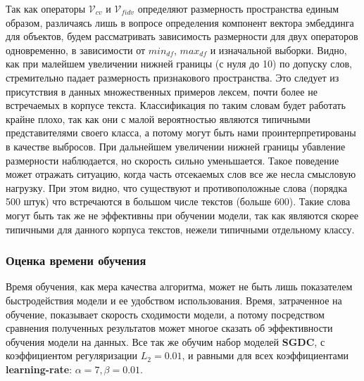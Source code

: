 \documentclass{article}
\begin{document}
            Так как операторы $\mathcal{V}_{cv}$ и $\mathcal{V}_{fidv}$ определяют размерность пространства единым образом, различаясь лишь в вопросе определения компонент вектора эмбеддинга для объектов, будем рассматривать зависимость размерности для двух операторов одновременно, в зависимости от ${min}_{df}$, ${max}_{df}$ и изначальной выборки. 
\clearpage
            Видно, как при малейшем увеличении нижней границы (с нуля до 10) по допуску слов, стремительно падает размерность признакового пространства. Это следует из присутствия в данных множественных примеров лексем, почти более не встречаемых в корпусе текста. Классификация по таким словам будет работать крайне плохо, так как они с малой вероятностью являются типичными представителями своего класса, а потому могут быть нами проинтерпретированы в качестве выбросов. При дальнейшем увеличении нижней границы убавление размерности наблюдается, но скорость сильно уменьшается. Такое поведение может отражать ситуацию, когда часть отсекаемых слов все же несла смысловую нагрузку. При этом видно, что существуют и противоположные слова (порядка 500 штук) что встречаются в большом числе текстов (больше 600). Такие слова могут быть так же не эффективны при обучении модели, так как являются скорее типичными для данного корпуса текстов, нежели типичными отдельному классу. 

        \subsubsection{Оценка времени обучения}

            Время обучения, как мера качества алгоритма, может не быть лишь показателем быстродействия модели и ее удобством использования. Время, затраченное на обучение, показывает скорость сходимости модели, а потому посредством сравнения полученных результатов может многое сказать об эффективности обучения модели на данных. Все так же обучим набор моделей \textbf{SGDC}, с коэффициентом регуляризации $L_2=0.01$, и равными для всех коэффициентами \textbf{learning-rate}: $\alpha=7, \beta=0.01$.
\end{document}
